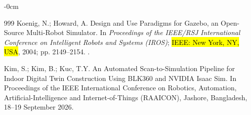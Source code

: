 \documentclass[electronics,article,accept,pdftex,moreauthors]{Definitions/mdpi}
\begin{document}
\begin{adjustwidth}{-\extralength}{0cm}
\begin{thebibliography}{999}
Koenig, N.; Howard, A.
\newblock Design and Use Paradigms for {Gazebo}, an Open-Source Multi-Robot
  Simulator.
\newblock In\textit{ Proceedings of the IEEE/RSJ International Conference on Intelligent Robots and
  Systems (IROS)}; \hl{IEEE: New York, NY, USA},  2004; pp. 2149--2154.
.

Kim, S.; Kim, B.; Kuc, T.Y.
\newblock An Automated Scan-to-Simulation Pipeline for Indoor Digital Twin
  Construction Using {BLK360} and {NVIDIA} {Isaac} {Sim}.
\newblock In Proceedings of the IEEE International Conference on Robotics, Automation,
  Artificial-Intelligence and Internet-of-Things (RAAICON), Jashore,
  Bangladesh,   18–19 September 2026. 

\end{thebibliography}
\PublishersNote{}
\end{adjustwidth}
\end{document}
